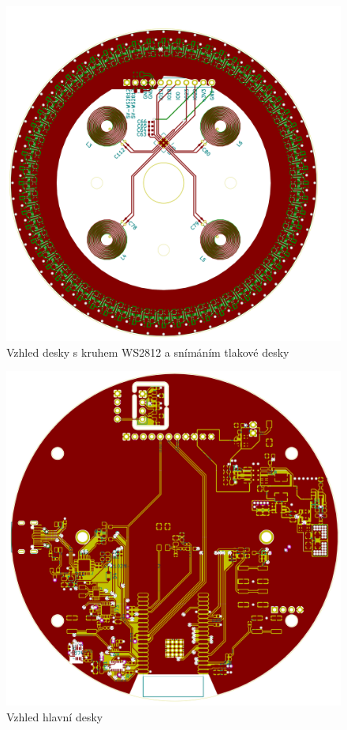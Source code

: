 \begin{figure}
    \centering
    \includegraphics[width=\textwidth]{kapitoly/obrazky/E4/E4-LEDBoard.png}
    \caption{Vzhled desky s kruhem WS2812 a snímáním tlakové desky}
    \label{fig:E4-LedDeska}
\end{figure}

\begin{figure}
    \centering
    \includegraphics[width=\textwidth]{kapitoly/obrazky/E4/E4-MainBoard.png}
    \caption{Vzhled hlavní desky}
    \label{fig:E4-MainBoard}
\end{figure}



